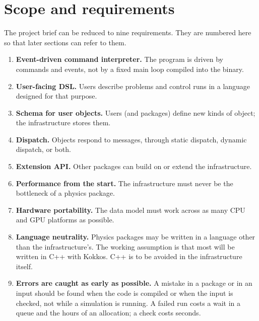 \documentclass[11pt,a4paper]{article}
\begin{document}
\tableofcontents
\newpage

\section{Scope and requirements}
\label{sec:requirements}

The project brief can be reduced to nine requirements.  They are numbered
here so that later sections can refer to them.

\begin{enumerate}[label=\textbf{R\arabic*},leftmargin=3em]
  \item \label{req:interp} \textbf{Event-driven command interpreter.}  The
        program is driven by commands and events, not by a fixed main loop
        compiled into the binary.
  \item \label{req:dsl} \textbf{User-facing DSL.}  Users describe problems and
        control runs in a language designed for that purpose.
  \item \label{req:schema} \textbf{Schema for user objects.}  Users (and
        packages) define new kinds of object; the infrastructure stores them.
  \item \label{req:dispatch} \textbf{Dispatch.}  Objects respond to messages,
        through static dispatch, dynamic dispatch, or both.
  \item \label{req:api} \textbf{Extension API.}  Other packages can build on
        or extend the infrastructure.
  \item \label{req:perf} \textbf{Performance from the start.}  The
        infrastructure must never be the bottleneck of a physics package.
  \item \label{req:port} \textbf{Hardware portability.}  The data model must
        work across as many CPU and GPU platforms as possible.
  \item \label{req:lang} \textbf{Language neutrality.}  Physics packages may
        be written in a language other than the infrastructure's.  The
        working assumption is that most will be written in C++ with Kokkos.
        C++ is to be avoided in the infrastructure itself.
  \item \label{req:early} \textbf{Errors are caught as early as possible.}
        A mistake in a package or in an input should be found when the code
        is compiled or when the input is checked, not while a simulation is
        running.  A failed run costs a wait in a queue and the hours of an
        allocation; a check costs seconds.
\end{enumerate}
\end{document}
